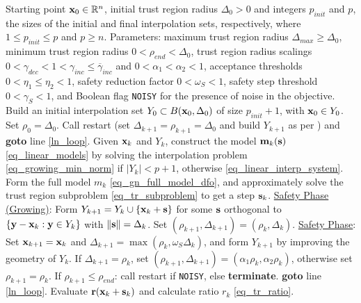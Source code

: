 \begin{algorithm}
	\small{
	\begin{algorithmic}[1]
		\Require Starting point $\mathbf{x}_0\in\mathbb{R}^n$, initial trust region radius $\Delta_0>0$ and integers $p_{init}$ and $p$, the sizes of the initial and final interpolation sets, respectively,
where $1\leq p_{init}\leq p$ and   $p\geq n$. 
		\vspace{0.2em}
		\Statex Parameters: maximum trust region radius $\Delta_{max}\geq\Delta_0$, minimum trust region radius $0<\rho_{end}<\Delta_0$, trust region radius scalings $0<\gamma_{dec}<1<\gamma_{inc}\leq\overline{\gamma}_{inc}$ and $0<\alpha_1<\alpha_2<1$, acceptance thresholds $0 < \eta_1 \leq \eta_2 < 1$, safety reduction factor $0 < \omega_S < 1$, safety step threshold $0 < \gamma_S < 1$, and Boolean flag \texttt{NOISY} for the presence of noise in the objective.
		\vspace{0.5em}
		\State Build an initial interpolation set $Y_0\subset B(\mathbf{x}_0,\Delta_0)$ of size $p_{init}+1$, with $\mathbf{x}_0\in Y_0$. Set $\rho_0=\Delta_0$.
				\State Call restart (set $\Delta_{k+1}=\rho_{k+1}=\Delta_0$ and build $Y_{k+1}$ as per ) and \textbf{goto} line \ref{ln_loop}.
			\EndIf
			\State Given $\mathbf{x}_k$ and $Y_k$, construct the model $\mathbf{m}_k(\mathbf{s})$ \eqref{eq_linear_models}
by solving the interpolation problem \eqref{eq_growing_min_norm} if $ |Y_k|<p+1$, otherwise \eqref{eq_linear_interp_system}.\label{ln_loop}
\State Form the full model $m_k$ \eqref{eq_gn_full_model_dfo}, and  
approximately solve the trust region subproblem \eqref{eq_tr_subproblem} to get a step $\mathbf{s}_k$.\label{ln_trs}
					\State \underline{Safety Phase (Growing)}: Form $Y_{k+1}=Y_k\cup\{\mathbf{x}_k+\mathbf{s}\}$ for some $\mathbf{s}$ orthogonal to $\{\mathbf{y}-\mathbf{x}_k : \mathbf{y}\in Y_k\}$ with $\|\mathbf{s}\|=\Delta_k$.
					\State Set $(\rho_{k+1}, \Delta_{k+1}) = (\rho_k, \Delta_k)$.
				\Else
					\State \underline{Safety Phase}: Set $\mathbf{x}_{k+1}=\mathbf{x}_k$ and $\Delta_{k+1} = \max(\rho_k, \omega_S \Delta_k)$, and form $Y_{k+1}$ by improving the geometry of $Y_k$.
					\State If $\Delta_{k+1} = \rho_k$, set $(\rho_{k+1}, \Delta_{k+1}) = (\alpha_1\rho_k, \alpha_2\rho_k)$, otherwise set $\rho_{k+1}=\rho_k$.
					\State If $\rho_{k+1}\leq \rho_{end}$: call restart if \texttt{NOISY}, else \textbf{terminate}.
				\EndIf
				\State \textbf{goto} line \ref{ln_loop}.
			\EndIf
			\State Evaluate $\mathbf{r}(\mathbf{x}_k+\mathbf{s}_k)$ and calculate ratio $r_k$ \eqref{eq_tr_ratio}.

\end{algorithmic}}
\end{algorithm}
